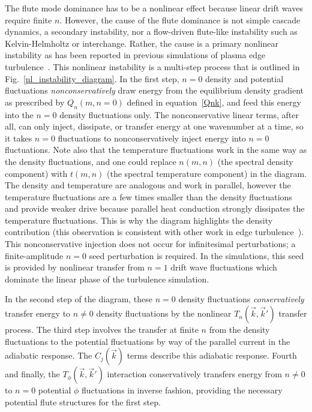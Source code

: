 \documentclass[showpacs,preprintnumbers,amsmath,amssymb,superscriptaddress,aip]{revtex4-1}
\begin{document}
The flute mode dominance has to be a nonlinear effect because linear drift waves require finite $n$. However, the cause of the flute dominance is not simple cascade dynamics, a secondary 
instability, nor a flow-driven flute-like instability such as
Kelvin-Helmholtz or interchange. Rather, the cause is a primary
nonlinear instability as has been reported in previous simulations of
plasma edge turbulence~\cite{biskamp1995,drake1995}. 
This nonlinear instability is a multi-step process that is outlined in Fig.~\ref{nl_instability_diagram}.
In the first step, $n=0$ density and potential fluctuations \emph{nonconservatively} draw energy from the equilibrium density gradient as prescribed 
by $Q_n(m,n=0)$ defined in equation~\ref{Qnk}, and feed
this energy into the $n=0$ density fluctuations only. The nonconservative linear terms, after all, can only inject, dissipate, or transfer energy at one wavenumber at a time, so it takes
$n=0$ fluctuations to nonconservatively inject energy into $n=0$
fluctuations. Note also that the temperature fluctuations work in the same way as the density fluctuations, and one could replace $n(m,n)$ (the spectral density component)
with $t(m,n)$ (the spectral temperature component) in the diagram. The density and temperature are analogous and work in parallel, however the temperature fluctuations are a few times smaller
than the density fluctuations and provide weaker drive because
parallel heat conduction strongly dissipates the temperature
fluctuations. This is why the diagram highlights the density
contribution (this observation is consistent with other work in edge turbulence~\cite{zeiler1997}).
 This nonconservative injection does not occur for
infinitesimal perturbations; a finite-amplitude $n=0$ seed
perturbation is required.  In the simulations, this seed is provided
by nonlinear transfer from $n=1$ drift wave fluctuations which
dominate the linear phase of the turbulence simulation.

In the second step of the diagram, these $n=0$ density fluctuations
\emph{conservatively} transfer energy to $n \ne 0$ density fluctuations by the nonlinear $T_n(\vec{k},\vec{k}')$ transfer process. 
The third step involves the transfer at finite $n$ from the density
fluctuations to the potential fluctuations by way of the parallel current in the adiabatic response. The $C_j(\vec{k})$ terms describe this adiabatic response.
Fourth and finally, the $T_\phi(\vec{k},\vec{k}')$ interaction conservatively transfers energy from
$n \ne 0$ to $n=0$ potential $\phi$ fluctuations in inverse fashion, providing the necessary potential flute structures for the first step.
\end{document}
